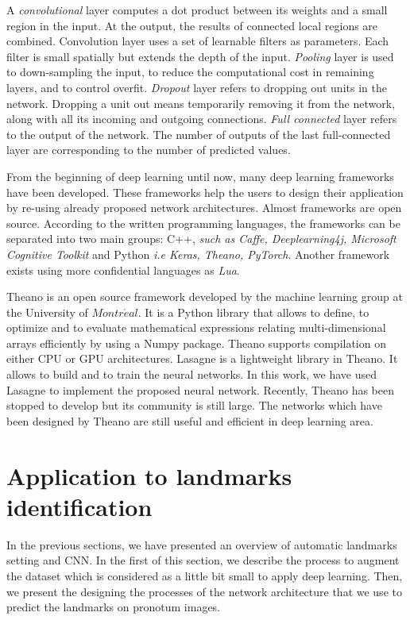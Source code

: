 \documentclass{article} %
\begin{document}
\begin{multicols}{2}
A \textit{convolutional} layer computes a dot product between its weights and a small region in the input. At the output, the results of connected local regions are combined. Convolution layer uses a set of learnable filters as parameters. Each filter is small spatially but extends the depth of the input. \textit{Pooling} layer is used to down-sampling the input, to reduce the computational cost in remaining layers, and to control overfit. \textit{Dropout} layer refers to dropping out units in the network. Dropping a unit out means temporarily removing it from the network, along with all its incoming and outgoing connections. \textit{Full connected} layer refers to the output of the network. The number of outputs of the last full-connected layer are corresponding to the number of predicted values.

From the beginning of deep learning until now, many deep learning frameworks have been developed.
These frameworks help the users to design their application by re-using already proposed network architectures. Almost frameworks are open source. According to the written programming languages, the frameworks can be separated into two main groups: C++, \textit{such as Caffe, Deeplearning4j, Microsoft Cognitive Toolkit} and Python \textit{i.e Keras, Theano, PyTorch}. Another framework exists using more confidential languages as \textit{Lua}.

Theano \cite{theanoframework} is an open source framework developed by the machine learning group at the University of $Montr\acute{e}al$. It is a Python library that allows to define, to optimize and to evaluate mathematical expressions relating multi-dimensional arrays efficiently by using a Numpy package. Theano supports compilation on either CPU or GPU architectures. Lasagne \cite{lasagne} is a lightweight library in Theano. It allows to build and to train the neural networks. In this work, we have used Lasagne to implement the proposed neural network. Recently, Theano has been stopped to develop but its community is still large. The networks which have been designed by Theano are still useful and efficient in deep learning area.
\section{Application to landmarks identification}
In the previous sections, we have presented an overview of automatic landmarks setting and CNN. In the first of this section, we describe the process to augment the dataset which is considered as a little bit small to apply deep learning. Then, we present the designing the processes of the network architecture that we use to predict the landmarks on pronotum images.


\end{multicols}
\end{document}
